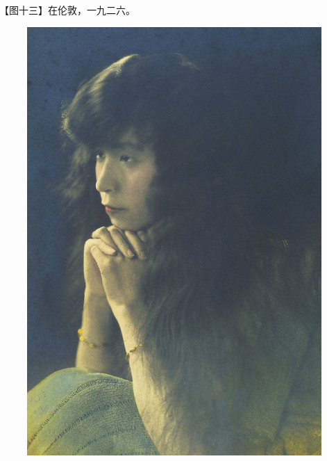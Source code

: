 \clearpage
\par 【图十三】在伦敦，一九二六。
\begin{figure}[htb]
    \centering %
    \includegraphics[scale=0.4]{picture/对照记13.jpeg}
\end{figure}

